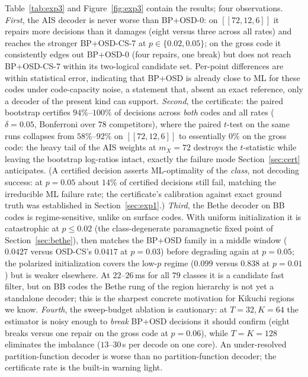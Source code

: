 \documentclass[a4paper,11pt]{quantumarticle}
\theoremstyle{definition}
\begin{document}
Table~\ref{tab:exp3} and Figure~\ref{fig:exp3} contain the results; four
observations. \emph{First}, the AIS decoder is never worse than BP+OSD-0:
on $[\![72,12,6]\!]$ it repairs more decisions than it damages (eight
versus three across all rates) and reaches the stronger BP+OSD-CS-7 at
$p\in\{0.02,0.05\}$; on the gross code it consistently edges out BP+OSD-0
(four repairs, one break) but does not reach BP+OSD-CS-7 within its
two-logical candidate set. Per-point differences are within statistical
error, indicating that BP+OSD is already close to ML for these codes under
code-capacity noise, a statement that, absent an exact reference, only a
decoder of the present kind can support. \emph{Second}, the certificate:
the paired bootstrap certifies $94\%$--$100\%$ of decisions across
\emph{both} codes and all rates ($\delta=0.05$, Bonferroni over $78$
competitors), where the paired $t$-test on the same runs collapses from
$58\%$--$92\%$ on $[\![72,12,6]\!]$ to essentially $0\%$ on the gross
code: the heavy tail of the AIS weights at $m_X=72$ destroys the
$t$-statistic while leaving the bootstrap log-ratios intact, exactly the
failure mode Section~\ref{sec:cert} anticipates. (A certified decision
asserts ML-optimality of the \emph{class}, not decoding success: at
$p=0.05$ about $14\%$ of certified decisions still fail, matching the
irreducible ML failure rate; the certificate's calibration against exact
ground truth was established in Section~\ref{sec:exp1}.) \emph{Third}, the
Bethe decoder on BB codes is regime-sensitive, unlike on surface codes.
With uniform initialization it is catastrophic at $p\le0.02$ (the
class-degenerate paramagnetic fixed point of
Section~\ref{sec:bethe}), then matches the BP+OSD family in a middle
window ($0.0427$ versus OSD-CS's $0.0417$ at $p=0.03$) before degrading
again at $p=0.05$; the polarized initialization covers the low-$p$ regime
($0.099$ versus $0.838$ at $p=0.01$) but is weaker elsewhere. At
$22$--$26$\,ms for all $79$ classes it is a candidate fast filter, but on
BB codes the Bethe rung of the region hierarchy is not yet a standalone
decoder; this is the sharpest concrete motivation for Kikuchi regions we
know.
\emph{Fourth}, the sweep-budget ablation is cautionary: at $T=32,K=64$ the
estimator is noisy enough to \emph{break} BP+OSD decisions it should
confirm (eight breaks versus one repair on the gross code at $p=0.06$),
while $T=K=128$ eliminates the imbalance ($13$--$30$\,s per decode on one
core). An under-resolved partition-function decoder is worse than no
partition-function decoder; the certificate rate is the built-in warning
light.
\end{document}
